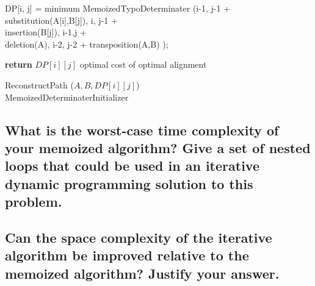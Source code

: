 \documentclass[letterpaper,12pt]{article}
\begin{document}
\IncMargin{1em}
\begin{algorithm}
\BlankLine
{}
{DP[i, j] = minimum MemoizedTypoDeterminater (i-1, j-1 + \\
     substitution(A[i],B[j]), i, j-1  +\\ 
     insertion(B[j]), i-1,j   + \\
     deletion(A), i-2, j-2 + transposition(A,B)   );\newline
    
\textbf{return} {$DP[i][j]$ optimal cost of optimal alignment }}
{ReconstructPath} {($A,B, DP[i][j]$) }\\
\caption{MemoizedDeterminaterInitializer\label{IR2}}

\end{algorithm}\DecMargin{1em}
% 
\clearpage 
\subsection{What is the worst-case time complexity of your memoized algorithm? Give a set of nested loops that could be used in an iterative dynamic programming solution to this problem.}


\subsection{Can the space complexity of the iterative algorithm be improved relative to the memoized algorithm? Justify your answer.}
\end{document}
